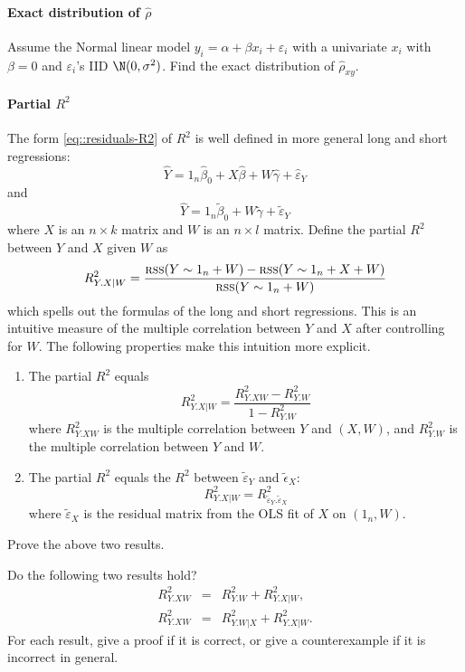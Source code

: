 \paragraph{Exact distribution of $\hat{\rho}$}\label{hw9::exact-d-rho}

Assume the Normal linear model $y_i = \alpha + \beta x_i + \varepsilon_i$ with
 a univariate $x_i$ with $\beta = 0$ and $\varepsilon_i$'s IID $\N(0,  \sigma^2 )$. 
 Find the exact distribution of $\hat{\rho}_{xy}$. 

 

\paragraph{Partial $R^2$}\label{hw09::partial-R2}


The form \eqref{eq::residuals-R2} of $R^2$ is well defined in more general long and short regressions:
$$
\hat{Y} = 1_n \hat{\beta}_0 + X \hat{\beta} + W \hat{\gamma} + \hat{\varepsilon}_Y
$$
and
$$
\hat{Y} = 1_n \tilde{\beta}_0   + W \tilde{\gamma} + \tilde{\varepsilon}_Y
$$
where $X$ is an $n\times k$ matrix and $W$ is an $n\times l$ matrix. Define the partial $R^2$ between $Y$ and $X$ given $W$ as
$$
R^2_{Y.X|W} = \frac{ \textsc{rss}(Y\sim 1_n+W) -   \textsc{rss}(Y\sim 1_n+X+W) }{ \textsc{rss}(Y\sim 1_n+W) }
$$
which spells out the formulas of the long and short regressions. This is an intuitive measure of the multiple correlation between $Y$ and $X$ after controlling for $W$. The following properties make this intuition more explicit. 


\begin{enumerate}
\item
The partial $R^2$ equals 
$$
R^2_{Y.X|W} = \frac{  R^2_{Y.XW}  - R^2_{Y.W}  }{ 1- R^2_{Y.W}}
$$
where $R^2_{Y.XW} $ is the multiple correlation between $Y$ and $(X,W)$, and $R^2_{Y.W}$ is the multiple correlation between $Y$ and $W$.

\item
The partial $R^2$ equals the $R^2$ between $ \tilde{\varepsilon}_Y $ and $\tilde{\epsilon}_X$:
$$
R^2_{Y.X|W} =  R^2_{  \tilde{\varepsilon}_Y . \tilde{\varepsilon}_X }
$$
where $\tilde{\varepsilon}_X$ is the residual matrix from the OLS fit of $X$ on $(1_n, W)$. 
\end{enumerate}

Prove the above two results. 

Do the following two results hold? 
\begin{eqnarray*}
R^2_{Y.XW} &=& R^2_{Y.W} +  R^2_{Y.X|W} ,\\
R^2_{Y.XW} &=& R^2_{Y.W|X} +  R^2_{Y.X|W}.
\end{eqnarray*}
For each result, give a proof if it is correct, or give a counterexample if it is incorrect in general. 




